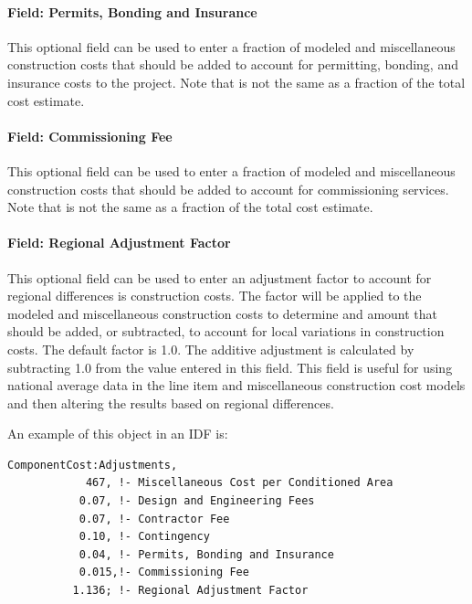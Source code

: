\paragraph{Field: Permits, Bonding and Insurance}\label{field-permits-bonding-and-insurance}

This optional field can be used to enter a fraction of modeled and miscellaneous construction costs that should be added to account for permitting, bonding, and insurance costs to the project. Note that is not the same as a fraction of the total cost estimate.

\paragraph{Field: Commissioning Fee}\label{field-commissioning-fee}

This optional field can be used to enter a fraction of modeled and miscellaneous construction costs that should be added to account for commissioning services. Note that is not the same as a fraction of the total cost estimate.

\paragraph{Field: Regional Adjustment Factor}\label{field-regional-adjustment-factor}

This optional field can be used to enter an adjustment factor to account for regional differences is construction costs. The factor will be applied to the modeled and miscellaneous construction costs to determine and amount that should be added, or subtracted, to account for local variations in construction costs. The default factor is 1.0. The additive adjustment is calculated by subtracting 1.0 from the value entered in this field. This field is useful for using national average data in the line item and miscellaneous construction cost models and then altering the results based on regional differences.

An example of this object in an IDF is:

\begin{lstlisting}
ComponentCost:Adjustments,
            467, !- Miscellaneous Cost per Conditioned Area
           0.07, !- Design and Engineering Fees
           0.07, !- Contractor Fee
           0.10, !- Contingency
           0.04, !- Permits, Bonding and Insurance
           0.015,!- Commissioning Fee
          1.136; !- Regional Adjustment Factor
\end{lstlisting}


